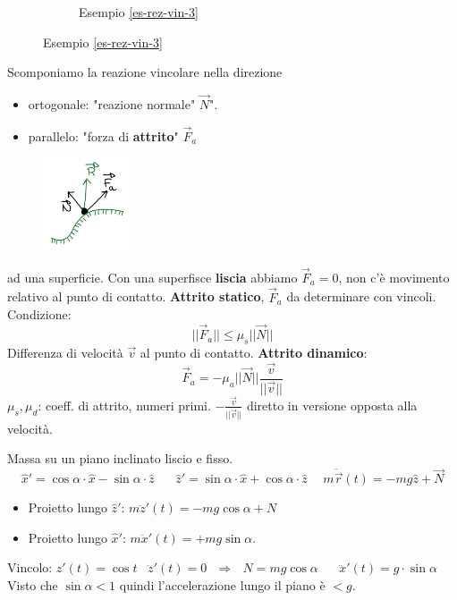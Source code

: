 \begin{figure}[h!]
\begin{subfigure}[b]{0.2\textwidth}
        \caption*{Esempio \ref{es-rez-vin-3}}
    \end{subfigure}
\end{figure}
\hspace{-15pt}Scomponiamo la reazione vincolare nella direzione
\begin{itemize}
    \item ortogonale: "reazione normale" $\vec{N}$".
    \item parallelo: "forza di \textbf{attrito}" $\vec{F}_a$
\end{itemize}
\newpage
\begin{figure}
    \centering
    \includegraphics[width=2.7cm]{images/scomposizione-reazione-vincolare.png}
\end{figure}
ad una superficie. Con una superfisce \textbf{liscia} abbiamo $\vec{F}_a = 0$, non c'è
movimento relativo al punto di contatto.
\textbf{Attrito statico}, $\vec{F}_a$ da determinare con vincoli. Condizione: $$||\vec{F}_a|| \leq \mu_s ||\vec{N}||$$
Differenza di velocità $\vec{v}$ al punto di contatto. \textbf{Attrito dinamico}:
$$\vec{F}_a = -\mu_a ||\vec{N}||\frac{\vec{v}}{||\vec{v}||}$$
$\mu_s, \mu_d$: coeff. di attrito, numeri primi.
$-\frac{\vec{v}}{||\vec{v}||}$ diretto in versione opposta alla velocità.

\begin{example}\label{es-rez-vin-4}
    Massa su un piano inclinato liscio e fisso.
    $$\hat{x}' = \cos\alpha \cdot \hat{x} - \sin\alpha \cdot \hat{z} \hspace{20pt}\hat{z}' = \sin\alpha \cdot \hat{x} + \cos\alpha \cdot \hat{z} \hspace{15pt} m\ddot{\vec{r}}(t) = -mg\hat{z} + \vec{N}$$
    \begin{itemize}
        \item Proietto lungo $\hat{z}'$: \hspace{15pt} $m\ddot{z}'(t) = -mg\cos\alpha + N$
        \item Proietto lungo $\hat{x}'$: \hspace{15pt} $m\ddot{x}'(t) = +mg\sin\alpha$.
    \end{itemize}
    Vincolo: $z'(t) = \cos t \hspace{10pt} \ddot{z}'(t) = 0\:\:\: \Rightarrow\:\:\: N = mg\cos\alpha \hspace{20pt} \ddot{x}'(t) = g \cdot \sin\alpha$\\
    Visto che $\sin\alpha < 1$ quindi l'accelerazione lungo il piano è $< g$.
\end{example}

